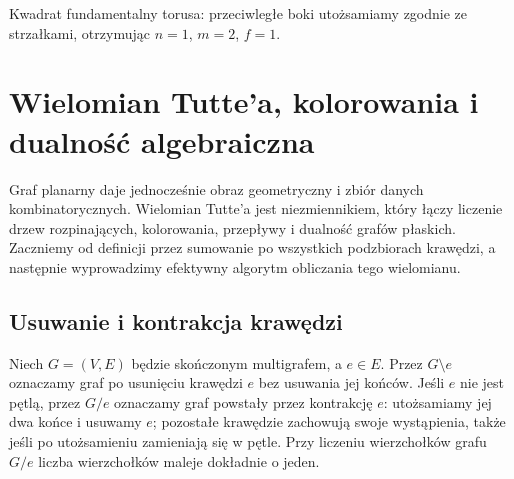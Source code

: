 \begin{center}

{\footnotesize Kwadrat fundamentalny torusa: przeciwległe boki
utożsamiamy zgodnie ze strzałkami, otrzymując $n=1$, $m=2$, $f=1$.}
\end{center}


\chapter{Wielomian Tutte'a, kolorowania i dualność algebraiczna}
\label{ch:tg-tutte}

Graf planarny daje jednocześnie obraz geometryczny i zbiór danych
kombinatorycznych. Wielomian Tutte'a jest niezmiennikiem, który
łączy liczenie drzew rozpinających, kolorowania, przepływy
i dualność grafów płaskich. Zaczniemy od definicji przez
sumowanie po wszystkich podzbiorach krawędzi, a następnie
wyprowadzimy efektywny algorytm obliczania tego wielomianu.

\section{Usuwanie i kontrakcja krawędzi}
\label{sec:tg-deletion-contraction}

\begin{definicja}
Niech $G=(V,E)$ będzie skończonym multigrafem, a $e\in E$.
Przez $G\setminus e$ oznaczamy graf po usunięciu krawędzi $e$
bez usuwania jej końców. Jeśli $e$ nie jest pętlą,
przez $G/e$ oznaczamy graf powstały przez kontrakcję $e$:
utożsamiamy jej dwa końce i usuwamy $e$; pozostałe krawędzie
zachowują swoje wystąpienia, także jeśli po utożsamieniu
zamieniają się w pętle. Przy liczeniu wierzchołków grafu $G/e$
liczba wierzchołków maleje dokładnie o jeden.
\end{definicja}

